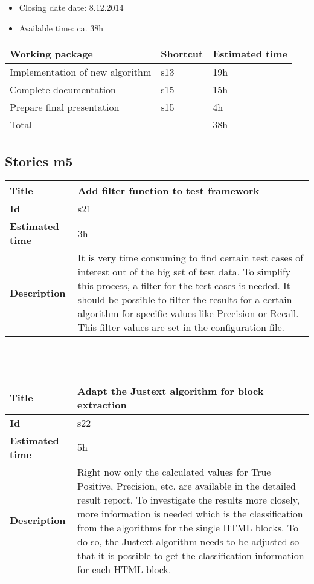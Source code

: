 \begin{itemize}
\item Closing date date: 8.12.2014
\item Available time: ca. 38h
\end{itemize}

    \begin{tabular}{ | p{10cm} | p{2cm} | p{2cm} |}
    \hline
    \textbf{Working package} & \textbf{Shortcut}& \textbf{Estimated time} \\ \hline
    Implementation of new algorithm & s13 & 19h \\
    Complete documentation & s15 & 15h \\
    Prepare final presentation & s15 & 4h \\ \hline
    Total &  & 38h\\
    \hline
    \end{tabular}

\subsection {Stories m5}

    \begin{tabular}{ | p{4cm} | p{10cm} |}
    \hline
    \textbf{Title} & Add filter function to test framework\\ \hline
    \textbf{Id} & s21\\ \hline
    \textbf{Estimated time} & 3h \\ \hline
    \textbf{Description} &  It is very time consuming to find certain test cases of interest out of the big set of test data. To simplify this process, a filter for the test cases is needed. It should be possible to filter the results for a certain algorithm for specific values like Precision or Recall. This filter values are set in the configuration file.\\ 
    \hline
    \end{tabular} \\\\

    \begin{tabular}{ | p{4cm} | p{10cm} |}
    \hline
    \textbf{Title} & Adapt the Justext algorithm for block extraction\\ \hline
    \textbf{Id} & s22\\ \hline
    \textbf{Estimated time} & 5h \\ \hline
    \textbf{Description} &  Right now only the calculated values for True Positive, Precision, etc. are available in the detailed result report. To investigate the results more closely, more information is needed which is the classification from the algorithms for the single HTML blocks. To do so, the Justext algorithm needs to be adjusted so that it is possible to get the classification information for each HTML block.\\ 
    \hline
    \end{tabular} \\\\

